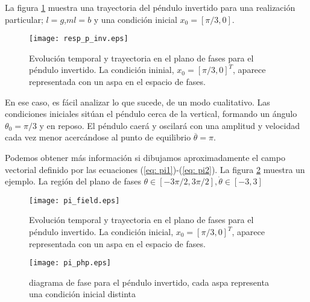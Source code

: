La figura \ref{fig:trpen} muestra una trayectoria del péndulo invertido para una realización particular; $l=g$,$ml=b$ y una condición inicial $x_0=[\pi/3,0]$. 

\begin{figure}
\texttt{[image: resp\_p\_inv.eps]}
\caption{Evolución temporal y trayectoria en el plano de fases para el péndulo invertido. La condición ininial, $x_0=[\pi/3,0]^T$, aparece representada con un aspa en el espacio de fases.} \label{fig:trpen}
\end{figure}

En ese caso, es fácil analizar lo que sucede, de un modo cualitativo. Las condiciones iniciales sitúan el péndulo cerca de la vertical, formando un ángulo $\theta_0 =\pi/3$ y en reposo. El péndulo caerá y oscilará con una amplitud y velocidad cada vez menor acercándose al punto de equilibrio $\overline \theta = \pi$.

Podemos obtener más información si dibujamos aproximadamente el campo vectorial definido por las ecuaciones (\ref{eq: pi1})-(\ref{eq: pi2}). La figura \ref{fig:pifield} muestra un ejemplo. La región del plano de fases $\theta \in [-3\pi/2,3\pi/2], \dot \theta \in [-3,3]$
 
\begin{figure}
\centering
\texttt{[image: pi\_field.eps]}
\caption{Evolución temporal y trayectoria en el plano de fases para el péndulo invertido. La condición inicial, $x_0=[\pi/3,0]^T$, aparece representada con un aspa en el espacio de fases.} \label{fig:pifield}
\end{figure}

 \begin{figure}
\centering
\texttt{[image: pi\_php.eps]}
\caption{diagrama de fase para el péndulo invertido, cada aspa representa una condición inicial distinta} \label{fig:piphp}
\end{figure}





